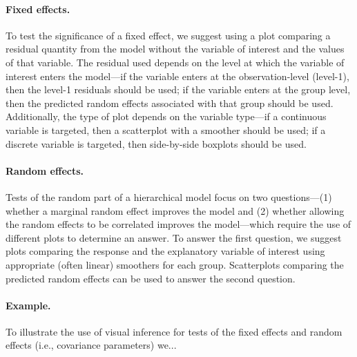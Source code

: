 \documentclass{article} %
\begin{document}
\paragraph{Fixed effects.} To test the significance of a fixed effect, we suggest using a plot comparing a residual quantity from the model without the variable of interest and the values of that variable. The residual used depends on the level at which the variable of interest enters the model---if the variable enters at the observation-level (level-1), then the level-1 residuals should be used; if the variable enters at the group level, then the predicted random effects associated with that group should be used. Additionally, the type of plot depends on the variable type---if a continuous variable is targeted, then a scatterplot with a smoother should be used; if a discrete variable is targeted, then side-by-side boxplots should be used.



\paragraph{Random effects.} Tests of the random part of a hierarchical model focus on two questions---(1) whether a marginal random effect improves the model and (2) whether allowing the random effects to be correlated improves the model---which require the use of different plots to determine an answer. To answer the first question, we suggest plots comparing the response and the explanatory variable of interest using appropriate (often linear) smoothers for each group. Scatterplots comparing the predicted random effects can be used to answer the second question.


\paragraph{Example.}
To illustrate the use of visual inference for tests of the fixed effects and random effects (i.e., covariance parameters) we...
\end{document}
